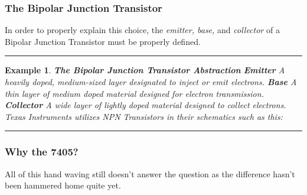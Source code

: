 \documentclass[12pt]{report}
\newtheorem{example}{Example}
\newenvironment{examp}
{\vspace{0.5cm}
\hrule
\begin{example}}
{\hrule
\vspace{0.5cm}
\end{example}}
\begin{document}
\subsubsection*{The Bipolar Junction Transistor}
In order to properly explain this choice, the \textit{emitter, base,} and \textit{collector} of a Bipolar Junction Transistor must be properly defined.
\begin{examp}
	\textbf{The Bipolar Junction Transistor Abstraction}
	\newline
	\textbf{Emitter}
	\textnormal{A \textit{heavily} doped, medium-sized layer designated to inject or emit electrons.}
	\newline
	\textbf{Base}
	\textnormal{A thin layer of \textit{medium} doped material designed for electron transmission.}
	\newline
	\textbf{Collector}
	\textnormal{A wide layer of \textit{lightly} doped material designed to \textit{collect} electrons.}
	\newline
	Texas Instruments utilizes NPN Transistors in their schematics such as this:
	\begin{figure}[h]
	\end{figure}
\end{examp}
\subsubsection*{Why the 7405?}
All of this hand waving still doesn't answer the question as the difference hasn't been hammered home quite yet.
\end{document}
